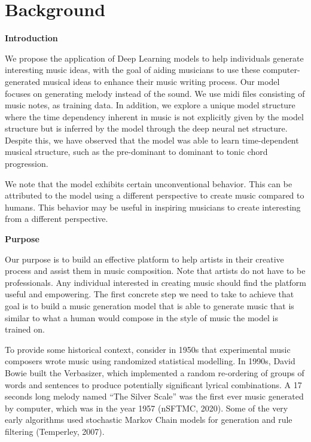 \documentclass[12pt,oneside]{chicagocapstone}
\begin{document}
\hypertarget{background}{%
\chapter*{Background}\label{background}}

\textbf{Introduction}

We propose the application of Deep Learning models to help individuals generate interesting music ideas, with the goal of aiding musicians to use these computer-generated musical ideas to enhance their music writing process. Our model focuses on generating melody instead of the sound. We use midi files consisting of music notes, as training data. In addition, we explore a unique model structure where the time dependency inherent in music is not explicitly given by the model structure but is inferred by the model through the deep neural net structure. Despite this, we have observed that the model was able to learn time-dependent musical structure, such as the pre-dominant to dominant to tonic chord progression.

We note that the model exhibits certain unconventional behavior. This can be attributed to the model using a different perspective to create music compared to humans. This behavior may be useful in inspiring musicians to create interesting from a different perspective.

\textbf{Purpose}

Our purpose is to build an effective platform to help artists in their creative process and assist them in music composition. Note that artists do not have to be professionals. Any individual interested in creating music should find the platform useful and empowering. The first concrete step we need to take to achieve that goal is to build a music generation model that is able to generate music that is similar to what a human would compose in the style of music the model is trained on.

To provide some historical context, consider in 1950s that experimental music composers wrote music using randomized statistical modelling. In 1990s, David Bowie built the Verbasizer, which implemented a random re-ordering of groups of words and sentences to produce potentially significant lyrical combinations. A 17 seconds long melody named ``The Silver Scale'' was the first ever music generated by computer, which was in the year 1957 (nSFTMC, 2020). Some of the very early algorithms used stochastic Markov Chain models for generation and rule filtering (Temperley, 2007).
\end{document}
